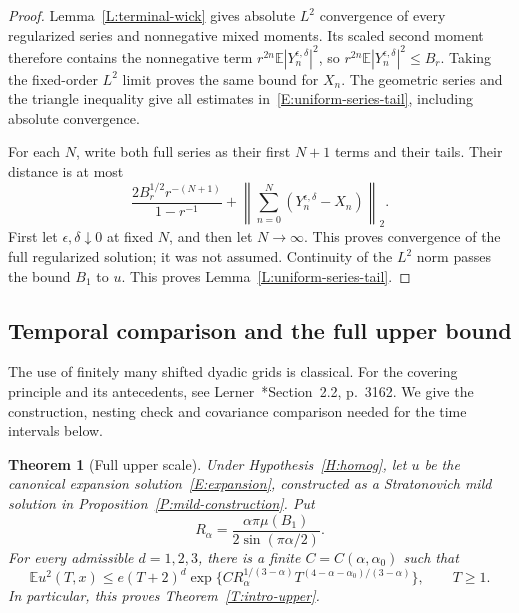 \documentclass[12pt,oneside,openany]{book}
\numberwithin{equation}{section}
\newtheorem{theorem}{Theorem}[section]
\theoremstyle{nogostyle}
\theoremstyle{definition}
\newcommand{\E}{\mathbb{E}}
\begin{document}
\begin{proof}
  Lemma~\ref{L:terminal-wick} gives absolute $L^2$ convergence of every
  regularized series and nonnegative mixed moments. Its scaled second moment
  therefore contains the nonnegative term $r^{2n}\E|Y_n^{\epsilon,\delta}|^2$,
  so $r^{2n}\E|Y_n^{\epsilon,\delta}|^2 \le B_r$. Taking the fixed-order $L^2$
  limit proves the same bound for $X_n$. The geometric series and the triangle
  inequality give all estimates in~\eqref{E:uniform-series-tail}, including
  absolute convergence.

  For each $N$, write both full series as their first $N+1$ terms and their
  tails. Their distance is at most
  \[
    \frac{2B_r^{1/2}r^{-(N+1)}}{1-r^{-1}}
    +\left\|\sum_{n=0}^N(Y_n^{\epsilon,\delta}-X_n)\right\|_2.
  \]
  First let $\epsilon,\delta\downarrow0$ at fixed $N$, and then let $N \to
  \infty$. This proves convergence of the full regularized solution; it was not
  assumed. Continuity of the $L^2$ norm passes the bound $B_1$ to $u$. This
  proves Lemma~\ref{L:uniform-series-tail}.
\end{proof}

\subsection{Temporal comparison and the full upper bound}

The use of finitely many shifted dyadic grids is classical. For the covering
principle and its antecedents, see
Lerner~\cite{lerner:source2013:simple}*{Section~2.2, p.~3162}.
We give the construction, nesting check and covariance comparison needed for
the time intervals below.

\begin{theorem}[Full upper scale]\label{T:full-upper}
  Under Hypothesis~\ref{H:homog}, let $u$ be the canonical expansion
  solution~\eqref{E:expansion}, constructed as a Stratonovich mild solution in
  Proposition~\ref{P:mild-construction}. Put
  \[
    R_\alpha=\frac{\alpha\pi\mu(B_1)}{2\sin(\pi\alpha/2)}.
  \]
  For every admissible $d = 1,2,3$, there is a finite $C = C(\alpha,\alpha_0)$
  such that
  \begin{equation}\label{E:full-upper-bound}
    \E u^2(T,x)
    \le e(T+2)^d
    \exp\{C R_\alpha^{1/(3-\alpha)}
    T^{(4-\alpha-\alpha_0)/(3-\alpha)}\},\qquad T\ge1.
  \end{equation}
  In particular, this proves Theorem~\ref{T:intro-upper}.
\end{theorem}
\end{document}
